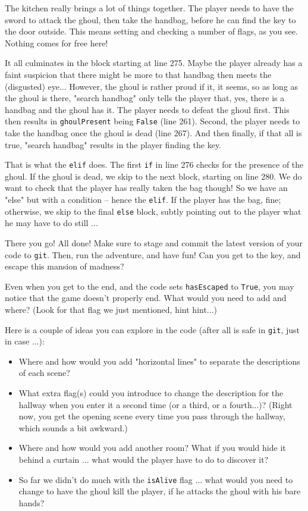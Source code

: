 The kitchen really brings a lot of things together. The player needs to have the sword to attack the ghoul, then take the handbag, before he can find the key to the door outside. This means setting and checking a number of flags, as you see. Nothing comes for free here! 

It all culminates in the block starting at line 275. Maybe the player already has a faint suspicion that there might be more to that handbag then meets the (disgusted) eye... However, the ghoul is rather proud if it, it seems, so as long as the ghoul is there, "search handbag" only tells the player that, yes, there is a handbag and the ghoul has it. The player needs to defeat the ghoul first. This then results in \texttt{ghoulPresent} being \texttt{False} (line 261). Second, the player needs to take the handbag once the ghoul is dead (line 267). And then finally, if that all is true, "search handbag" results in the player finding the key. 

That is what the \texttt{elif} does. The first \texttt{if} in line 276 checks for the presence of the ghoul. If the ghoul is dead, we skip to the next block, starting on line 280. We do want to check that the player has really taken the bag though! So we have an "else" but with a condition -- hence the \texttt{elif}. If the player has the bag, fine; otherwise, we skip to the final \texttt{else} block, subtly pointing out to the player what he may have to do still ...  

There you go! All done! Make sure to stage and commit the latest version of your code to \texttt{git}. Then, run the adventure, and have fun! Can you get to the key, and escape this mansion of madness? 

\begin{Exe}
Even when you get to the end, and the code sets \texttt{hasEscaped} to \texttt{True}, you may notice that the game doesn't properly end. What would you need to add and where? (Look for that flag we just mentioned, hint hint...)   
\end{Exe}


\begin{Exe}
Here is a couple of ideas you can explore in the code (after all is safe in \texttt{git}, just in case ...): 
\begin{itemize}
\item Where and how would you add "horizontal lines" to separate the descriptions of each scene? 
\item What extra flag(s) could you introduce to change the description for the hallway when you enter it a second time (or a third, or a fourth...)? (Right now, you get the opening scene every time you pass through the hallway, which sounds a bit awkward.)  
\item Where and how would you add another room? What if you would hide it behind a curtain ... what would the player have to do to discover it? 
\item So far we didn't do much with the \texttt{isAlive} flag ... what would you need to change to have the ghoul kill the player, if he attacks the ghoul with his bare hands?
\end{itemize}
\end{Exe}

